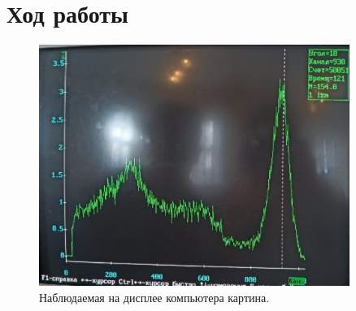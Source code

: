 \documentclass[a4paper, 12pt]{article}%
\begin{document}
\section{Ход работы}

\begin{figure}[!h]
\includegraphics[width = 0.9\textwidth]{4.png}
\centering
\caption{Наблюдаемая на дисплее компьютера картина.}
\end{figure}
\end{document}
